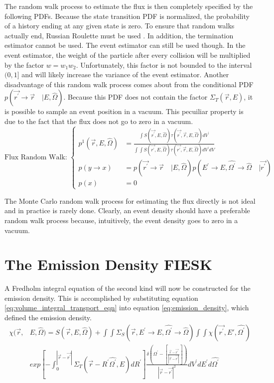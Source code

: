The random walk process to estimate the flux is then completely specified by
the following PDFs. Because the state transition PDF is normalized, the 
probability of a history ending at any given state is zero. To ensure that
random walks actually end, Russian Roulette must be used \citep{spanier}. 
In addition, the termination estimator cannot be used. The event estimator
can still be used though. In the event estimator, the weight of the particle
after every collision will be multiplied by the factor $w = w_1w_2$. 
Unfortunately, this factor is not bounded to the interval $(0,1]$ and will 
likely increase the variance of the event estimator. Another disadvantage of
this random walk process comes about from the conditional PDF 
$p(\vec{r^{'}} \to \vec{r}\quad| E,\hat{\Omega})$. Because this PDF does not
contain the factor $\Sigma_T(\vec{r},E)$, it is possible to sample an event
position in a vacuum. This pecuiliar property is due to the fact that the flux
does not go to zero in a vacuum.
\begin{equation}
  \text{Flux Random Walk: }
  \begin{cases}
    p^1(\vec{r},E,\hat{\Omega}) & = \frac{\int S(\vec{r^{'}},E,\hat{\Omega})
    \tau(\vec{r^{'}},\vec{r},E,\hat{\Omega}) dV^{'}}{\int\int S(\vec{r^{'}},E,\hat{\Omega})
    \tau(\vec{r^{'}},\vec{r},E,\hat{\Omega}) dV^{'} dV} \\
    p(y \to x) & = p(\vec{r^{'}} \to \vec{r}\quad| E,\hat{\Omega})
    p(E^{'} \to E, \hat{\Omega^{'}} \to \hat{\Omega}\quad|\vec{r^{'}}) \\
    p(x) & = 0
  \end{cases}
  \label{eq:flux_random_walk_pdfs}
\end{equation}

The Monte Carlo random walk process for estimating the flux directly is not 
ideal and in practice is rarely done. Clearly, an event density should have
a preferable random walk process because, intuitively, the event density
goes to zero in a vacuum. 

\section{The Emission Density FIESK}
A Fredholm integral equation of the second kind will
now be constructed for the emission density. This is accomplished by 
substituting equation \ref{eq:volume_integral_transport_eqn} into equation 
\ref{eq:emission_density}, which defined the emission density. 
\begin{equation*}
  \begin{split}
    \chi(\vec{r},&E,\hat{\Omega}) = S(\vec{r},E,\hat{\Omega}) +
    \int\int \Sigma_S(\vec{r},E^{'} \to E, \hat{\Omega^{'}} \to \hat{\Omega})
    \int\int \chi(\vec{r^{'}},E',\hat{\Omega^{'}}) \\
    & exp\left[-\int_0^{|\vec{r} - \vec{r^{'}}|} 
      \Sigma_T(\vec{r}-R^{'}\hat{\Omega^{'}},E)dR^{'} \right]
    \frac{\delta \left(\Omega^{'} - \left[\frac{\vec{r} - \vec{r^{'}}}
        {|\vec{r} - \vec{r^{'}}|}\right]\right)}
    {|\vec{r} - \vec{r^{'}}|^2} dV^{'}dE^{'}d\hat{\Omega^{'}}
  \end{split}
\end{equation*}

